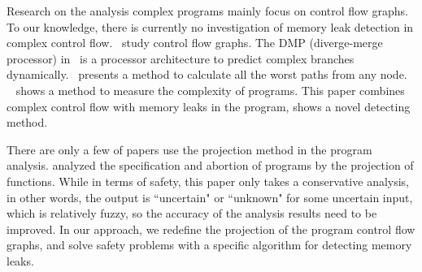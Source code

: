 Research on the analysis complex programs mainly focus on control flow graphs. To our knowledge, there is currently no investigation of memory leak detection in complex control flow.~\cite{KJMP06,KFM13} study control flow graphs. The DMP (diverge-merge processor) in~\cite{KJMP06} is a processor architecture to predict complex branches dynamically.~\cite{KFM13} presents a method to calculate all the worst paths from any node. 
~\cite{KK12} shows a method to measure the complexity of programs. This paper combines complex control flow with memory leaks in the program, shows a novel detecting method.

There are only a few of papers use the projection method in the program analysis. \cite{D94} analyzed the specification and abortion of programs by the projection of functions. While in terms of safety, this paper only takes a conservative analysis, in other words, the output is ``uncertain" or ``unknown" for some uncertain input, which is relatively fuzzy, so the accuracy of the analysis results need to be improved. In our approach, we redefine the projection of the program control flow graphs, and solve safety problems with a specific algorithm for detecting memory leaks.
